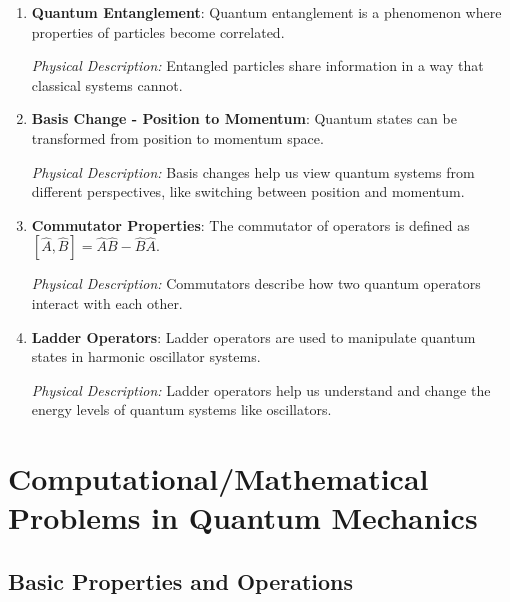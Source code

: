 \documentclass[a4paper]{article}
\begin{document}
\begin{enumerate}
    \item \textbf{Quantum Entanglement}: Quantum entanglement is a phenomenon where properties of particles become correlated.
    
    \textit{Physical Description:} Entangled particles share information in a way that classical systems cannot.

    \item \textbf{Basis Change - Position to Momentum}: Quantum states can be transformed from position to momentum space.
    
    \textit{Physical Description:} Basis changes help us view quantum systems from different perspectives, like switching between position and momentum.

    \item \textbf{Commutator Properties}: The commutator of operators is defined as $[\hat{A}, \hat{B}] = \hat{A}\hat{B} - \hat{B}\hat{A}$.
    
    \textit{Physical Description:} Commutators describe how two quantum operators interact with each other.

    \item \textbf{Ladder Operators}: Ladder operators are used to manipulate quantum states in harmonic oscillator systems.
    
    \textit{Physical Description:} Ladder operators help us understand and change the energy levels of quantum systems like oscillators.
\end{enumerate}

\section*{Computational/Mathematical Problems in Quantum Mechanics}

\subsection*{Basic Properties and Operations}
\end{document}
